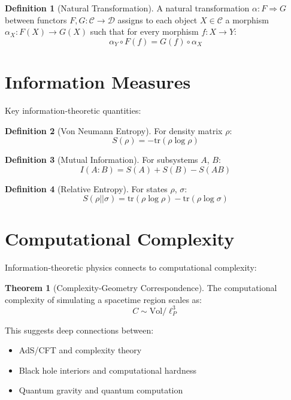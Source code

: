 \documentclass[11pt,a4paper]{article}
\theoremstyle{definition}
\newtheorem{definition}{Definition}[section]
\newtheorem{theorem}{Theorem}[section]
\newcommand{\tr}{\text{tr}}
\begin{document}
\begin{definition}[Natural Transformation]
A natural transformation $\alpha: F \Rightarrow G$ between functors $F,G: \mathcal{C} \to \mathcal{D}$ assigns to each object $X \in \mathcal{C}$ a morphism $\alpha_X: F(X) \to G(X)$ such that for every morphism $f: X \to Y$:
\[\alpha_Y \circ F(f) = G(f) \circ \alpha_X\]
\end{definition}

\section{Information Measures}

Key information-theoretic quantities:

\begin{definition}[Von Neumann Entropy]
For density matrix $\rho$:
\[S(\rho) = -\tr(\rho \log \rho)\]
\end{definition}

\begin{definition}[Mutual Information]
For subsystems $A$, $B$:
\[I(A:B) = S(A) + S(B) - S(AB)\]
\end{definition}

\begin{definition}[Relative Entropy]
For states $\rho$, $\sigma$:
\[S(\rho||\sigma) = \tr(\rho\log\rho) - \tr(\rho\log\sigma)\]
\end{definition}

\section{Computational Complexity}

Information-theoretic physics connects to computational complexity:

\begin{theorem}[Complexity-Geometry Correspondence]
The computational complexity of simulating a spacetime region scales as:
\[C \sim \text{Vol}/\ell_P^3\]
\end{theorem}

This suggests deep connections between:
\begin{itemize}
\item AdS/CFT and complexity theory
\item Black hole interiors and computational hardness
\item Quantum gravity and quantum computation
\end{itemize}
\end{document}
